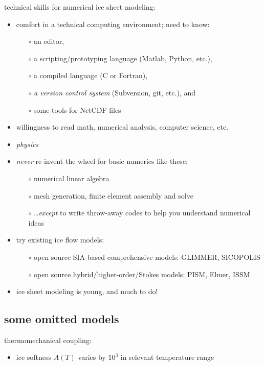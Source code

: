 \documentclass[titlepage,letterpaper,final,11pt]{scrartcl}
\begin{document}
technical skills for numerical ice sheet modeling:

\begin{itemize}
\item comfort in a technical computing environment; need to know:
  \begin{itemize}\small
  \item[$\circ$] an editor,
  \item[$\circ$] a scripting/prototyping language (Matlab, Python, etc.),
  \item[$\circ$] a compiled language (C or Fortran),
  \item[$\circ$] \emph{a version control system} (Subversion, git, etc.), and
  \item[$\circ$] some tools for NetCDF files
  \normalsize
  \end{itemize}
\item willingness to read math, numerical analysis, computer science, etc.
\item \emph{physics}
\item \emph{never} re-invent the wheel for basic numerics like these:
  \begin{itemize}
  \item[$\circ$] numerical linear algebra
  \item[$\circ$] mesh generation, finite element assembly and solve
  \item[$\circ$] \dots \emph{except} to write throw-away codes to help you understand numerical ideas 
  \end{itemize}
\item try existing ice flow models:
  \begin{itemize}
  \item[$\circ$] open source SIA-based comprehensive models: GLIMMER, SICOPOLIS
  \item[$\circ$] open source hybrid/higher-order/Stokes models: PISM, Elmer, ISSM
  \end{itemize}
\item ice sheet modeling is young, and much to do!
\end{itemize}


\subsection{some omitted models}

thermomechanical coupling:

\begin{itemize}
\item ice softness $A(T)$ varies by $10^3$ in relevant temperature range
\end{itemize}
\end{document}
